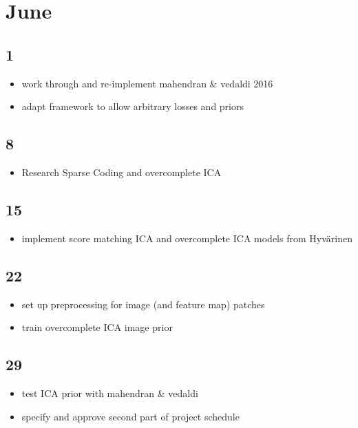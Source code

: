 \documentclass{article}
\begin{document}
\section*{June}

\subsection*{1}

\begin{itemize}
	\item  work through and re-implement mahendran \& vedaldi 2016
	\item adapt framework to allow arbitrary losses and priors
\end{itemize}

\subsection*{8}

\begin{itemize}
	\item Research Sparse Coding and overcomplete ICA
\end{itemize}

\subsection*{15}

\begin{itemize}
	\item implement score matching ICA and overcomplete ICA models from Hyvärinen
\end{itemize}



\subsection*{22}
	
\begin{itemize}
	\item set up preprocessing for image (and feature map) patches
	\item train overcomplete ICA image prior 
\end{itemize}
	
	
\subsection*{29}

\begin{itemize}
	\item test ICA prior with mahendran \& vedaldi
	\item specify and approve second part of project schedule
\end{itemize}
\end{document}

